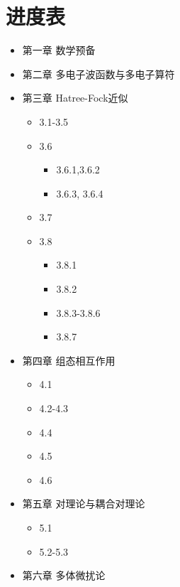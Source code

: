 \chapter*{进度表}
\begin{itemize}
    \item[\CheckedBox] 第一章  数学预备
    \item[\CheckedBox] 第二章  多电子波函数与多电子算符
    \item[\DSquare] 第三章  Hatree-Fock近似 
    	\begin{itemize}
		    \item[\CheckedBox] 3.1-3.5
		    \item[\DSquare] 3.6 
		    	\begin{itemize}
		            \item[\CheckedBox] 3.6.1,3.6.2
		            \item[\Square] 3.6.3, 3.6.4
		        \end{itemize}
		    \item[\Square] 3.7
		    \item[\DSquare] 3.8 
			   \begin{itemize}
				     \item[\CheckedBox] 3.8.1
				     \item[\CheckedBox] 3.8.2
				     \item[\Square] 3.8.3-3.8.6
				     \item[\DSquare] 3.8.7
			   \end{itemize}
    	\end{itemize}
    \item[\DSquare] 
    	第四章 组态相互作用 
	    \begin{itemize}
	        \item[\DSquare] 4.1
	        \item[\Square] 4.2-4.3
	        \item[\CheckedBox] 4.4
	        \item[\DSquare] 4.5
		\item[\Square] 4.6
	    \end{itemize}
    \item[\DSquare] 第五章 对理论与耦合对理论 
	    \begin{itemize}
	        \item[\DSquare] 5.1
	        \item[\Square] 5.2-5.3
	    \end{itemize}
    \item[\CheckedBox] 第六章 多体微扰论 

\end{itemize}
